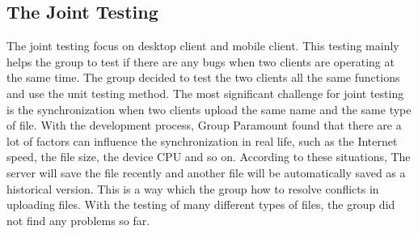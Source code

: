 \documentclass[11pt]{article}
\begin{document}
\subsection{The Joint Testing}
The joint testing focus on desktop client and mobile client. This testing mainly helps the group to test if there are any bugs when two clients are operating at the same time. The group decided to test the two clients all the same functions and use the unit testing method. The most significant challenge for joint testing is the synchronization when two clients upload the same name and the same type of file. With the development process, Group Paramount found that there are a lot of factors can influence the synchronization in real life, such as the Internet speed, the file size, the device CPU and so on. According to these situations, The server will save the file recently and another file will be automatically saved as a historical version. This is a way which the group how to resolve conflicts in uploading files. With the testing of many different types of files, the group did not find any problems so far.


\clearpage
\end{document}
